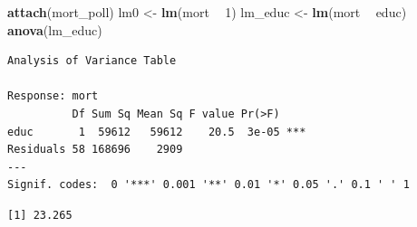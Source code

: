\documentclass[
]{book}
\newenvironment{Shaded}{\begin{snugshade}}{\end{snugshade}}
\newcommand{\DecValTok}[1]{\textcolor[rgb]{0.00,0.00,0.81}{#1}}
\newcommand{\KeywordTok}[1]{\textcolor[rgb]{0.13,0.29,0.53}{\textbf{#1}}}
\newcommand{\NormalTok}[1]{#1}
\newcommand{\OperatorTok}[1]{\textcolor[rgb]{0.81,0.36,0.00}{\textbf{#1}}}
\newcommand{\StringTok}[1]{\textcolor[rgb]{0.31,0.60,0.02}{#1}}
\begin{document}
\begin{Shaded}
\begin{Highlighting}[]
\KeywordTok{attach}\NormalTok{(mort_poll)}
\NormalTok{lm0 <-}\StringTok{ }\KeywordTok{lm}\NormalTok{(mort }\OperatorTok{~}\StringTok{ }\DecValTok{1}\NormalTok{)}
\NormalTok{lm_educ <-}\StringTok{ }\KeywordTok{lm}\NormalTok{(mort }\OperatorTok{~}\StringTok{ }\NormalTok{educ)}
\KeywordTok{anova}\NormalTok{(lm_educ)}
\end{Highlighting}
\end{Shaded}

\begin{verbatim}
Analysis of Variance Table

Response: mort
          Df Sum Sq Mean Sq F value Pr(>F)    
educ       1  59612   59612    20.5  3e-05 ***
Residuals 58 168696    2909                   
---
Signif. codes:  0 '***' 0.001 '**' 0.01 '*' 0.05 '.' 0.1 ' ' 1
\end{verbatim}

\begin{Shaded}
\end{Shaded}

\begin{verbatim}
[1] 23.265
\end{verbatim}

\begin{Shaded}
\end{Shaded}
\end{document}
